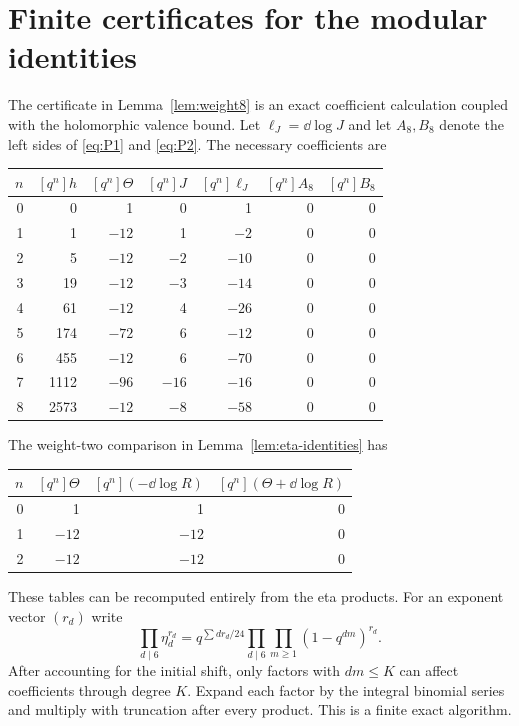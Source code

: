 \documentclass[11pt,a4paper]{article}
\theoremstyle{remark}
\begin{document}
\appendix
\section{Finite certificates for the modular identities}
\label{app:certificates}
The certificate in Lemma~\ref{lem:weight8} is an exact coefficient
calculation coupled with the holomorphic valence bound.
Let $\ell_J=\dd\log J$ and let $A_8,B_8$ denote the left sides
of \eqref{eq:P1} and \eqref{eq:P2}. The necessary coefficients are
\begin{center}\small
\begin{tabular}{r r r r r r r}
\toprule
$n$ & $[q^n]h$ & $[q^n]\Theta$ & $[q^n]J$ & $[q^n]\ell_J$
 & $[q^n]A_8$ & $[q^n]B_8$\\
\midrule
0 & 0 & 1 & 0 & 1 & 0 & 0\\
1 & 1 & $-12$ & 1 & $-2$ & 0 & 0\\
2 & 5 & $-12$ & $-2$ & $-10$ & 0 & 0\\
3 & 19 & $-12$ & $-3$ & $-14$ & 0 & 0\\
4 & 61 & $-12$ & 4 & $-26$ & 0 & 0\\
5 & 174 & $-72$ & 6 & $-12$ & 0 & 0\\
6 & 455 & $-12$ & 6 & $-70$ & 0 & 0\\
7 & 1112 & $-96$ & $-16$ & $-16$ & 0 & 0\\
8 & 2573 & $-12$ & $-8$ & $-58$ & 0 & 0\\
\bottomrule
\end{tabular}
\end{center}
The weight-two comparison in Lemma~\ref{lem:eta-identities} has
\begin{center}
\begin{tabular}{r r r r}
\toprule
$n$ & $[q^n]\Theta$ & $[q^n](-\dd\log R)$
 & $[q^n](\Theta+\dd\log R)$\\
\midrule
0 & 1 & 1 & 0\\
1 & $-12$ & $-12$ & 0\\
2 & $-12$ & $-12$ & 0\\
\bottomrule
\end{tabular}
\end{center}
These tables can be recomputed entirely from the eta products.
For an exponent vector $(r_d)$ write
\begin{equation}\label{eq:eta-product-algorithm}
 \prod_{d\mid6}\eta_d^{r_d}
 =q^{\sum d r_d/24}
  \prod_{d\mid6}\prod_{m\ge1}(1-q^{dm})^{r_d}.
\end{equation}
After accounting for the initial shift, only factors with
$dm\le K$ can affect coefficients through degree $K$.
Expand each factor by the integral binomial series and multiply
with truncation after every product. This is a finite exact algorithm.
\end{document}
